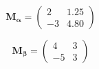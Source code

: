 \documentclass[60pt]{extarticle}
\begin{document}
{\Huge
\begin{equation*}
\mathbf{M_\alpha} =\begin{pmatrix}
2 & 1.25 \\
-3 & 4.80 
\end{pmatrix}
\end{equation*}
}

{\Huge
\begin{equation*}
\mathbf{M_\beta} =\begin{pmatrix}
4 & 3 \\
-5 & 3 
\end{pmatrix}
\end{equation*}
}
\end{document}
